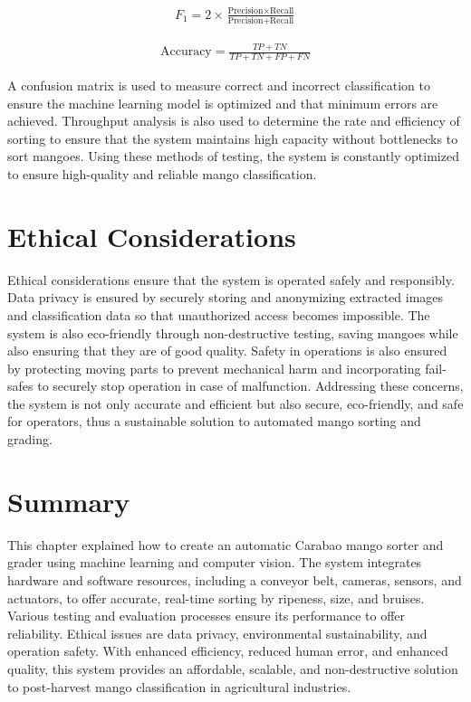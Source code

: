 \begin{eqnarray}
	F_1 = 2\times \frac{\text{Precision} \times \text{Recall}}{\text{Precision} + \text{Recall}}
	\label{eq:f1_score}
\end{eqnarray}

\begin{eqnarray}
	\text{Accuracy} = \frac{TP + TN}{TP + TN + FP + FN}
	\label{eq:accuracy}
\end{eqnarray}

A confusion matrix is used to measure correct and incorrect classification to ensure the machine learning model is optimized and that minimum errors are achieved. Throughput analysis is also used to determine the rate and efficiency of sorting to ensure that the system maintains high capacity without bottlenecks to sort mangoes. Using these methods of testing, the system is constantly optimized to ensure high-quality and reliable mango classification.

\section{Ethical Considerations}
Ethical considerations ensure that the system is operated safely and responsibly. Data privacy is ensured by securely storing and anonymizing extracted images and classification data so that unauthorized access becomes impossible. The system is also eco-friendly through non-destructive testing, saving mangoes while also ensuring that they are of good quality. Safety in operations is also ensured by protecting moving parts to prevent mechanical harm and incorporating fail-safes to securely stop operation in case of malfunction. Addressing these concerns, the system is not only accurate and efficient but also secure, eco-friendly, and safe for operators, thus a sustainable solution to automated mango sorting and grading.



\section{Summary}
This chapter explained how to create an automatic Carabao mango sorter and grader using machine learning and computer vision. The system integrates hardware and software resources, including a conveyor belt, cameras, sensors, and actuators, to offer accurate, real-time sorting by ripeness, size, and bruises. Various testing and evaluation processes ensure its performance to offer reliability. Ethical issues are data privacy, environmental sustainability, and operation safety. With enhanced efficiency, reduced human error, and enhanced quality, this system provides an affordable, scalable, and non-destructive solution to post-harvest mango classification in agricultural industries.
